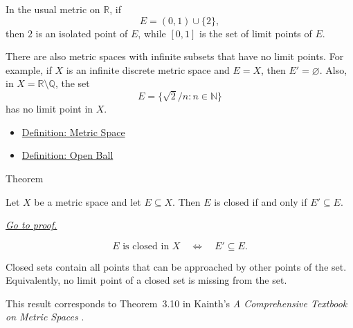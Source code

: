 \begin{remark*}[Examples]
In the usual metric on \(\mathbb{R}\), if
\[
  E=(0,1)\cup\{2\},
\]
then \(2\) is an isolated point of \(E\), while \([0,1]\) is the set of limit
points of \(E\).

There are also metric spaces with infinite subsets that have no limit points.
For example, if \(X\) is an infinite discrete metric space and \(E=X\), then
\(E'=\varnothing\).  Also, in \(X=\mathbb{R}\setminus\mathbb{Q}\), the set
\[
  E=\{\sqrt{2}/n:n\in\mathbb{N}\}
\]
has no limit point in \(X\).
\end{remark*}

\begin{dependencies}
\begin{itemize}
  \item \hyperref[def:metric-space]{Definition: Metric Space}
  \item \hyperref[def:metric-open-ball]{Definition: Open Ball}
\end{itemize}
\end{dependencies}

\begin{theorembox}{Theorem}
\begin{theorem}
\label{thm:metric-closed-sets-contain-limit-points}
Let \(X\) be a metric space and let \(E\subseteq X\).  Then \(E\) is closed if
and only if \(E'\subseteq E\).

\smallskip
\noindent
\hyperref[prf:metric-closed-sets-contain-limit-points]{\textit{Go to proof.}}
\end{theorem}
\end{theorembox}

\begin{remark*}
\[
E\text{ is closed in }X
\quad\Longleftrightarrow\quad
E'\subseteq E.
\]
\end{remark*}

\begin{remark*}[Interpretation]
Closed sets contain all points that can be approached by other points of the
set.  Equivalently, no limit point of a closed set is missing from the set.
\end{remark*}

\begin{remark*}
This result corresponds to Theorem~3.10 in Kainth's
\emph{A Comprehensive Textbook on Metric Spaces}
\cite{KainthComprehensiveMetricSpaces2023}.
\end{remark*}

